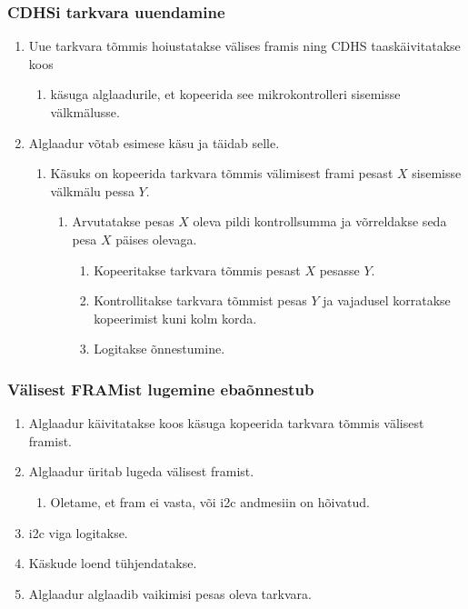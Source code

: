 \documentclass[12pt,a4paper]{article}
\begin{document}
\subsubsection{CDHSi tarkvara uuendamine}
\label{sec:usecase:upgrade}
\begin{enumerate}
	\item Uue tarkvara tõmmis hoiustatakse välises \gls{fram}is ning CDHS
		taaskäivitatakse koos
		\begin{enumerate}
			\item käsuga alglaadurile, et kopeerida see mikrokontrolleri
				sisemisse välkmälusse.
		\end{enumerate}
	\item Alglaadur võtab esimese käsu ja täidab selle.
		\begin{enumerate}
			\item Käsuks on kopeerida tarkvara tõmmis välimisest \gls{fram}i pesast \(X\)
				sisemisse välkmälu pessa \(Y\).
				\begin{enumerate}
					\item Arvutatakse pesas \(X\) oleva pildi kontrollsumma ja
						võrreldakse seda pesa \(X\) päises olevaga.
						\begin{enumerate}
							\item Kopeeritakse tarkvara tõmmis pesast \(X\) pesasse \(Y\).
							\item Kontrollitakse tarkvara tõmmist pesas \(Y\) ja
								vajadusel korratakse kopeerimist kuni kolm
								korda.
							\item Logitakse õnnestumine.
						\end{enumerate}
				\end{enumerate}
		\end{enumerate}
\end{enumerate}

\subsubsection{Välisest FRAMist lugemine ebaõnnestub}
\label{sec:usecase:framerror}
\begin{enumerate}
	\item Alglaadur käivitatakse koos käsuga kopeerida tarkvara tõmmis välisest
		\gls{fram}ist.
	\item Alglaadur üritab lugeda välisest \gls{fram}ist.
		\begin{enumerate}
		\item Oletame, et \gls{fram} ei vasta, või \gls{i2c} andmesiin on hõivatud.
		\end{enumerate}
	\item \gls{i2c} viga logitakse.
	\item Käskude loend tühjendatakse.
	\item Alglaadur alglaadib vaikimisi pesas oleva tarkvara.
\end{enumerate}
\end{document}
